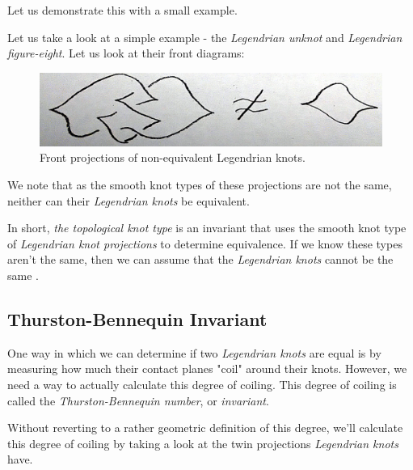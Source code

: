 \documentclass{article}
\begin{document}
Let us demonstrate this with a small example.

Let us take a look at a simple example - the \textit{Legendrian unknot} and
\textit{Legendrian figure-eight}. Let us
look at their front diagrams:
\begin{figure}[h!]
    \includegraphics[width=\linewidth]{notEq.jpg}
    \caption{Front projections of non-equivalent Legendrian knots.}
    \label{fig:knot1}
\end{figure}

We note that as the smooth knot types of these projections are not the same,
neither can their \textit{Legendrian knots} be equivalent.

In short, \textit{the topological knot type} is an invariant that uses the smooth
knot type of \textit{Legendrian knot projections} to determine equivalence. If we
know these types aren't the same, then we can assume that the \textit{Legendrian knots}
cannot be the same \cite{etnyre}.

\subsection{Thurston-Bennequin Invariant}

One way in which we can determine if two \textit{Legendrian knots} are equal
is by measuring how much their contact planes "coil" around their knots. However,
we need a way to actually calculate this degree of coiling. This degree of coiling
is called the \textit{Thurston-Bennequin number}, or \textit{invariant}.

Without reverting to a rather geometric definition of this degree, we'll
calculate this degree of coiling by taking a look at the twin projections
\textit{Legendrian knots} have.


\end{document}
